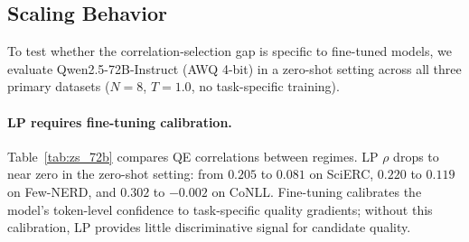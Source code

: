 
\subsection{Scaling Behavior}
\label{sec:scaling}

To test whether the correlation-selection gap is specific to fine-tuned models, we evaluate Qwen2.5-72B-Instruct (AWQ 4-bit) in a zero-shot setting across all three primary datasets ($N{=}8$, $T{=}1.0$, no task-specific training).

\begin{table}[t]
\centering
\small
\caption{Fine-tuned 8B vs.\ zero-shot 72B: QE correlations and entity construction ($N{=}8$, $T{=}1.0$). Degen.\ = instance degeneracy (\%). Constr.\ = LP-weighted entity construction $\Delta$F1 vs.\ greedy (pp). $^\dagger$Majority voting (uniform weights).}
\label{tab:zs_72b}
\end{table}

\paragraph{LP requires fine-tuning calibration.}
Table~\ref{tab:zs_72b} compares QE correlations between regimes.
LP $\rho$ drops to near zero in the zero-shot setting: from $0.205$ to $0.081$ on SciERC, $0.220$ to $0.119$ on Few-NERD, and $0.302$ to $-0.002$ on CoNLL.
Fine-tuning calibrates the model's token-level confidence to task-specific quality gradients; without this calibration, LP provides little discriminative signal for candidate quality.

